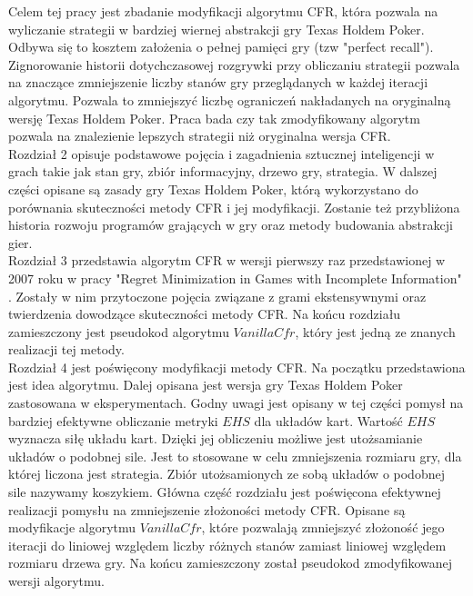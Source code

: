 \documentclass[licencjacka]{pracamgr}
\begin{document}
\noindent
Celem tej pracy jest zbadanie modyfikacji algorytmu CFR, która pozwala na wyliczanie strategii w bardziej wiernej
abstrakcji gry Texas Holdem Poker. Odbywa się to kosztem założenia o pełnej pamięci gry (tzw "perfect recall").
Zignorowanie historii dotychczasowej rozgrywki przy obliczaniu strategii pozwala na znaczące zmniejszenie liczby
stanów gry przeglądanych w każdej iteracji algorytmu. Pozwala to zmniejszyć liczbę ograniczeń nakładanych
na oryginalną wersję Texas Holdem Poker. Praca bada czy tak zmodyfikowany algorytm pozwala na znalezienie
lepszych strategii niż oryginalna wersja CFR. \\

\noindent
Rozdział 2 opisuje podstawowe pojęcia i zagadnienia sztucznej inteligencji w grach takie jak
stan gry, zbiór informacyjny, drzewo gry, strategia. W dalszej części opisane są zasady gry
Texas Holdem Poker, którą wykorzystano do porównania skuteczności metody CFR i jej modyfikacji.
Zostanie też przybliżona historia rozwoju programów grających w gry oraz metody budowania abstrakcji gier. \\

\noindent
Rozdział 3 przedstawia algorytm CFR w wersji pierwszy raz przedstawionej w 2007 roku w pracy
"Regret Minimization in Games with Incomplete Information" \cite{cfr}. Zostały w nim przytoczone pojęcia
związane z grami ekstensywnymi oraz twierdzenia dowodzące skuteczności metody CFR. Na końcu rozdziału
zamieszczony jest pseudokod algorytmu $VanillaCfr$, który jest jedną ze znanych realizacji tej metody. \\

\noindent
Rozdział 4 jest poświęcony modyfikacji metody CFR. Na początku przedstawiona jest idea algorytmu.
Dalej opisana jest wersja gry Texas Holdem Poker zastosowana w eksperymentach. Godny uwagi
jest opisany w tej części pomysł na bardziej efektywne obliczanie metryki $EHS$ dla układów kart.
Wartość $EHS$ wyznacza siłę układu kart. Dzięki jej obliczeniu możliwe jest utożsamianie układów
o podobnej sile. Jest to stosowane w celu zmniejszenia rozmiaru gry, dla której liczona jest strategia.
Zbiór utożsamionych ze sobą układów o podobnej sile nazywamy koszykiem.
Główna część rozdziału jest poświęcona efektywnej realizacji pomysłu na zmniejszenie złożoności
metody CFR. Opisane są modyfikacje algorytmu $VanillaCfr$, które pozwalają zmniejszyć złożoność
jego iteracji do liniowej względem liczby różnych stanów zamiast liniowej względem rozmiaru drzewa gry.
Na końcu zamieszczony został pseudokod zmodyfikowanej wersji algorytmu. \\
\end{document}

